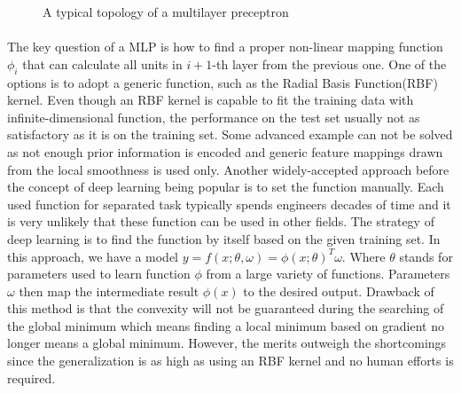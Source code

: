 \begin{figure}[!ht]
    \centering
    \caption{A typical topology of a multilayer preceptron}
    \label{lr_fig:ml_mlp_intro}
\end{figure}

\paragraph{}
The key question of a MLP is how to find a proper non-linear mapping function $\phi_i$ that can calculate all units in $i+1$-th layer from the previous one.
One of the options is to adopt a generic function, such as the Radial Basis Function(RBF)\cite{chang2010} kernel.
Even though an RBF kernel is capable to fit the training data with infinite-dimensional function, the performance on the test set usually not as satisfactory as it is on the training set.
Some advanced example can not be solved as not enough prior information is encoded and generic feature mappings drawn from the local smoothness is used only.
Another widely-accepted approach before the concept of deep learning being popular is to set the function manually.
Each used function for separated task typically spends engineers decades of time and it is very unlikely that these function can be used in other fields.
The strategy of deep learning is to find the function by itself based on the given training set.
In this approach, we have a model $y=f(x;\theta,\omega)=\phi(x;\theta)^T\omega$.
Where $\theta$ stands for parameters used to learn function $\phi$ from a large variety of functions.
Parameters $\omega$ then map the intermediate result $\phi(x)$ to the desired output.
Drawback of this method is that the convexity will not be guaranteed during the searching of the global minimum which means finding a local minimum based on gradient no longer means a global minimum.
However, the merits outweigh the shortcomings since the generalization is as high as using an RBF kernel and no human efforts is required.

